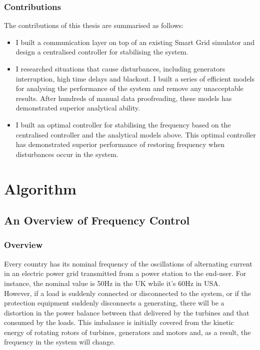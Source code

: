 \documentclass{report}
\begin{document}
\section{Contributions} %
The contributions of this thesis are summarised as follows:\\
\begin{itemize}
  \item I built a communication layer on top of an existing Smart Grid simulator and design a centralised controller for stabilising the system.\\
  
  \item I researched situations that cause disturbances, including generators interruption, high time delays and blackout. I built a series of efficient models for analysing the performance of the system and remove any unacceptable results. After hundreds of manual data proofreading, these models has demonstrated superior analytical ability.\\
  
  \item I built an optimal controller for stabilising the frequency based on the centralised controller and the analytical models above. This optimal controller has demonstrated superior performance of restoring frequency when disturbances occur in the system.\\
\end{itemize}


\part{Algorithm}
\chapter{An Overview of Frequency Control}
\label{Chapter2}
\section{Overview} %
Every country has its nominal frequency of the oscillations of alternating current in an electric power grid transmitted from a power station to the end-user. For instance, the nominal value is 50Hz in the UK while it’s 60Hz in USA.\\

However, if a load is suddenly connected or disconnected to the system, or if the protection equipment suddenly disconnects a generating, there will be a distortion in the power balance between that delivered by the turbines and that consumed by the loads. This imbalance is initially covered from the kinetic energy of rotating rotors of turbines, generators and motors and, as a result, the frequency in the system will change. \\
\end{document}

